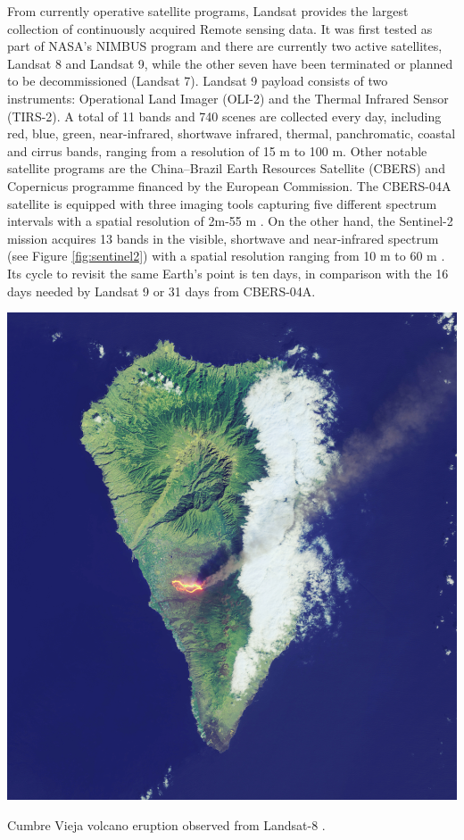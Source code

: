From currently operative satellite programs, Landsat provides the largest collection of continuously acquired \gls{Remote sensing} data. It was first tested as part of NASA's NIMBUS program and there are currently two active satellites, Landsat 8 and Landsat 9, while the other seven have been terminated or planned to be decommissioned (Landsat 7). Landsat 9 payload consists of two instruments: Operational Land Imager (OLI-2) and the Thermal Infrared Sensor (TIRS-2). A total of 11 bands and 740 scenes are collected every day, including red, blue, green, near-infrared, shortwave infrared, thermal, panchromatic, coastal and cirrus bands, ranging from a resolution of 15 \si{\meter} to 100 \si{\meter}. Other notable satellite programs are the China–Brazil Earth Resources Satellite (CBERS) and Copernicus programme financed by the European Commission. The CBERS-04A satellite is equipped with three imaging tools capturing five different spectrum intervals with a spatial resolution of 2\si{\meter}-55 \si{\meter} \cite{instituto_nacional_de_pesquisas_espaciais_inpecbers_2019}. On the other hand, the Sentinel-2 mission acquires 13 bands in the visible, shortwave and near-infrared spectrum (see Figure \ref{fig:sentinel2}) with a spatial resolution ranging from 10 \si{\meter} to 60 \si{\meter} \cite{european_environment_agency_eu_2017}. Its cycle to revisit the same Earth's point is ten days, in comparison with the 16 days needed by Landsat 9 or 31 days from CBERS-04A.

\begin{marginfigure}[-1cm]
	\includegraphics{figs/introduction/landsat8_lapalma.jpg}
	\caption{Cumbre Vieja volcano eruption observed from Landsat-8 \cite{nasa_earth_observatory_lava_2021}.}
	\label{fig:la_palma_landsat8}
\end{marginfigure}

